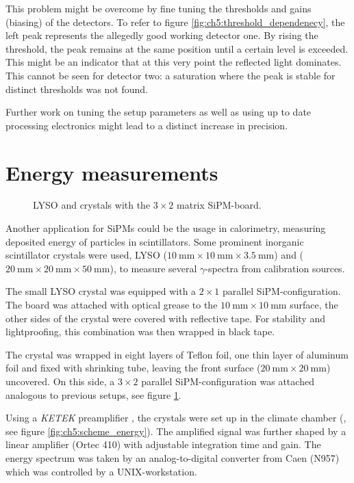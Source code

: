 This problem might be overcome by fine tuning the thresholds and gains (biasing) of the detectors. To refer to figure \ref{fig:ch5:threshold_dependenecy}, the left peak represents the allegedly good working detector one. By rising the threshold, the peak remains at the same position until a certain level is exceeded. This might be an indicator that at this very point the reflected light dominates. This cannot be seen for detector two: a saturation where the peak is stable for distinct thresholds was not found. \par 
Further work on tuning the setup parameters as well as using up to date processing electronics might lead to a distinct increase in precision. 

\section{Energy measurements}

\begin{figure}[t!]
	\centering
	\hfill
	\hfill
	\caption[LYSO and \pwo{} crystals]{LYSO and \pwo{} crystals with the $3\times 2$ matrix SiPM-board.}
	\label{fig:ch5:crystals}
\end{figure}

Another application for SiPMs could be the usage in calorimetry, measuring deposited energy of particles in scintillators. Some prominent inorganic scintillator crystals were used, LYSO ($\SI{10}{\milli\meter}\times\SI{10}{\milli\meter}\times\SI{3.5}{\milli\meter}$) and \pwo{} ($\SI{20}{\milli\meter}\times\SI{20}{\milli\meter}\times\SI{50}{\milli\meter}$), to measure several $\gamma$-spectra from calibration sources. \par 
The small LYSO crystal was equipped with a $2\times 1$ parallel SiPM-configuration. The board was attached with optical grease to the $\SI{10}{\milli\meter}\times\SI{10}{\milli\meter}$ surface, the other sides of the crystal were covered with reflective tape. For stability and lightproofing, this combination was then wrapped in black tape. \par 
The \pwo{} crystal was wrapped in eight layers of Teflon foil, one thin layer of aluminum foil and fixed with shrinking tube, leaving the front surface ($\SI{20}{\milli\meter}\times\SI{20}{\milli\meter}$) uncovered. On this side, a $3\times 2$ parallel SiPM-configuration was attached analogous to previous setups, see figure \ref{fig:ch5:crystals}. \par
Using a \textit{KETEK} preamplifier \cite{ketek_preamp}, the crystals were set up in the climate chamber (, see figure \ref{fig:ch5:scheme_energy}). The amplified signal was further shaped by a linear amplifier (Ortec 410) with adjustable integration time and gain. The energy spectrum was taken by an analog-to-digital converter from Caen (N957) which was controlled by a UNIX-workstation. \par   

